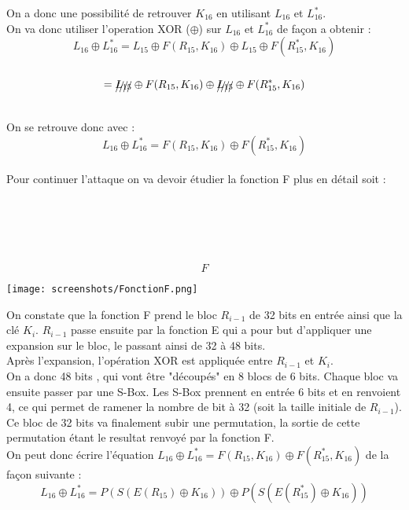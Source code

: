 \documentclass[a4paper,11pt]{article}
\begin{document}
	On a donc une possibilité de retrouver $K_{16}$ en utilisant $L_{16}$  et $L_{16}^{*}$.\\
	On va donc utiliser l'operation XOR ($\oplus$) sur $L_{16}$  et $L_{16}^{*}$ de façon a obtenir :\\
	$$L_{16}  \oplus L_{16}^{*} =  L_{15} \oplus F(R_{15}, K_{16}) \oplus  L_{15} \oplus F(R_{15}^{*}, K_{16}) $$\\
	                          $$= \xout{L_{15} } \oplus F(R_{15}, K_{16}) \oplus  \xout{L_{15} } \oplus F(R_{15}^{*}, K_{16})$$\\
	On se retrouve donc avec :\\
	$$L_{16}  \oplus L_{16}^{*} = F(R_{15}, K_{16}) \oplus F(R_{15}^{*}, K_{16})$$\\
	
	Pour continuer l'attaque on va devoir étudier la fonction F plus en détail soit :\\
	\\
	\\ \\ \\ \\ 
	$$F$$
	\begin{center}\texttt{[image: screenshots/FonctionF.png]}\end{center}
	On constate que la fonction F prend le bloc $R_{i - 1}$ de 32 bits en entrée ainsi que la clé $K_{i}$. $R_{i - 1}$ passe ensuite par la fonction  E qui a pour but d'appliquer une expansion sur le bloc, le passant ainsi de 32 à 48 bits.\\
	Après l'expansion, l'opération XOR est appliquée entre $R_{i - 1}$ et $K_{i}$.\\
	On a donc 48 bits , qui vont être "découpés" en 8 blocs de 6 bits. Chaque bloc va ensuite passer par une S-Box. Les S-Box prennent en entrée 6 bits et en renvoient 4, ce qui permet de ramener la nombre de bit à 32 (soit la taille initiale de $R_{i - 1}$).\\
	Ce bloc de 32 bits va finalement subir une permutation, la sortie de cette permutation étant le resultat renvoyé par la fonction F.\\
	On peut donc écrire l'équation $L_{16}  \oplus L_{16}^{*} = F(R_{15}, K_{16}) \oplus F(R_{15}^{*}, K_{16})$ de la façon suivante : \\
	$$L_{16}  \oplus L_{16}^{*} = P(S(E(R_{15})\oplus K_{16})) \oplus P(S(E(R_{15}^{*})\oplus K_{16}))$$
	
\end{document}

